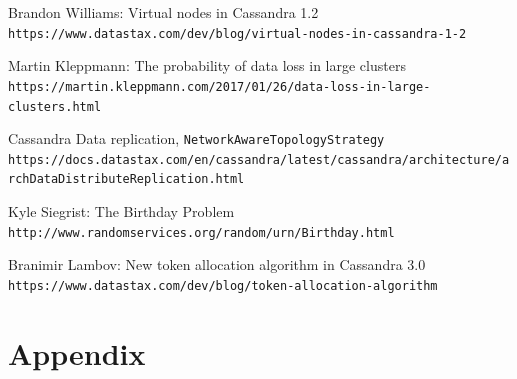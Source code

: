 \documentclass{article}
\begin{document}
\begin{thebibliography}{9}

Brandon Williams: Virtual nodes in Cassandra 1.2
\\\texttt{https://www.datastax.com/dev/blog/virtual-nodes-in-cassandra-1-2}

Martin Kleppmann: The probability of data loss in large clusters
\\\texttt{https://martin.kleppmann.com/2017/01/26/data-loss-in-large-clusters.html}

Cassandra Data replication, \texttt{NetworkAwareTopologyStrategy}
\texttt{https://docs.datastax.com/en/cassandra/latest/cassandra/architecture/archDataDistributeReplication.html}

Kyle Siegrist: The Birthday Problem
\\\texttt{http://www.randomservices.org/random/urn/Birthday.html}

Branimir Lambov: New token allocation algorithm in Cassandra 3.0
\\\texttt{https://www.datastax.com/dev/blog/token-allocation-algorithm}

\end{thebibliography}


\section{Appendix}
\end{document}
